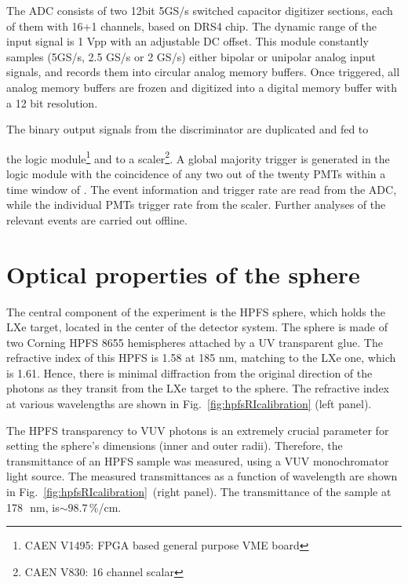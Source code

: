 The ADC consists of two 12bit 5GS/s switched capacitor digitizer sections, 
each of them with 16+1 channels, based on DRS4 chip. The dynamic range of the input signal is 1 
Vpp with an adjustable DC offset. This module constantly samples (5GS/s, 2.5 GS/s or 2 GS/s) either bipolar or unipolar analog input 
signals, and records them into circular 
analog memory buffers. Once triggered, all analog memory 
buffers are frozen and digitized into a digital memory buffer 
with a 12 bit resolution. 

The binary output signals from the discriminator are duplicated and fed to 

the logic module\footnote{CAEN V1495: FPGA based general purpose VME board} and to a scaler\footnote{CAEN V830: 16 channel scalar}. 
A global majority trigger is generated in the logic module with the coincidence of any two out of the twenty PMTs within a time window of . The event information and trigger rate are read from the ADC, while the individual PMTs trigger rate from the scaler. Further analyses of the relevant events are carried out offline.



\section{Optical properties of the sphere }
\label{sec:opt}


The central component of the experiment is the HPFS sphere, which holds the LXe target, located in the center of the detector system. The sphere is made of two Corning HPFS 8655 hemispheres attached by a UV transparent glue. The refractive index of this HPFS is 1.58 at 185 nm, matching to the LXe one, which is 1.61. Hence, there is minimal diffraction from the original direction of the photons as they transit from the LXe target to the sphere. The refractive index at various wavelengths are shown in Fig.~\ref{fig:hpfsRIcalibration} (left panel).


The HPFS transparency to VUV photons is an extremely crucial parameter for setting the sphere's dimensions (inner and outer radii). 
Therefore, the transmittance of an HPFS sample was measured, using a VUV monochromator light source. The measured transmittances as a function of wavelength are shown in Fig.~\ref{fig:hpfsRIcalibration}~(right panel). The transmittance of the sample at 178~\,nm, is$\sim98.7$\,\%/cm.  

